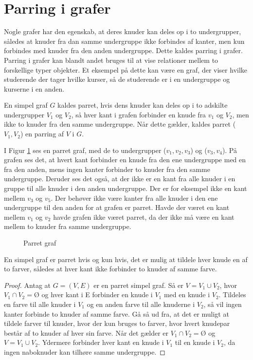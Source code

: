 \section{Parring i grafer}
Nogle grafer har den egenskab, at deres knuder kan deles op i to undergrupper, således at knuder fra dan samme undergruppe ikke forbindes af kanter, men kun forbindes med knuder fra den anden undergruppe.
Dette kaldes parring i grafer.
Parring i grafer kan blandt andet bruges til at vise relationer mellem to forskellige typer objekter.
Et eksempel på dette kan være en graf, der viser hvilke studerende der tager hvilke kurser, så de studerende er i en undergruppe og kurserne i en anden. 

\begin{defn}
	En simpel graf $G$ kaldes parret, hvis dens knuder kan deles op i to adskilte undergrupper $V_1$ og $V_2$, så hver kant i grafen forbinder en knude fra $v_1$ og $V_2$, men ikke to knuder fra den samme undergruppe.
	Når dette gælder, kaldes parret ($V_1,V_2$) en parring af $V$ i $G$.
\end{defn}

\begin{exmp}
	I Figur \ref{parret_graf} ses en parret graf, med de to undergrupper ($v_1,v_2,v_3$) og ($v_3,v_4$). 
	På grafen ses det, at hvert kant forbinder en knude fra den ene undergruppe med en fra den anden, mens ingen kanter forbinder to knuder fra den samme undergruppe. 
	Deruder ses det også, at der ikke er en kant fra alle knuder i en gruppe til alle knuder i den anden undergruppe.
	Der er for eksempel ikke en kant mellem $v_3$ og $v_5$. 
	Der behøver ikke være kanter fra alle knuder i den ene undergruppe til den anden for at grafen er parret.
	Havde der været en kant mellem $v_1$ og $v_2$ havde grafen ikke været parret, da der ikke må være en kant mellem to knuder fra samme undergruppe.
\end{exmp}

\begin{figure}[h]
	\centering
	
	\caption{Parret graf} \label{parret_graf}
\end{figure}

\begin{thm}
	En simpel graf er parret hvis og kun hvis, det er mulig at tildele hver knude en af to farver, således at hver kant ikke forbinder to knuder af samme farve. 
\label{farve_satning}
\end{thm}

\begin{proof}
	Antag at $G=(V,E)$ er en parret simpel graf. Så er $V=V_1 \cup V_2$, hvor $V_1 \cap V_2 = Ø$ og hver kant i E forbinder en knude i $V_1$ med en knude i $V_2$. 
	Tildeles en farve til alle knuder i $V_1$ og en anden farve til alle knuderne i $V_2$, så vil ingen kanter forbinde to knuder af samme farve. 
	Gå så ud fra, at det er muligt at tildele farver til knuder, hvor der kun bruges to farver, hvor hvert knudepar består af to knuder af hver sin farve.
	Når det gælder er $V_1 \cap V_2=Ø$ og $V=V_1 \cup V_2$.
	Ydermere forbinder hver kant en knude i $V_1$ til en knude i $V_2$, da ingen naboknuder kan tilhøre samme undergruppe. 
\end{proof}

